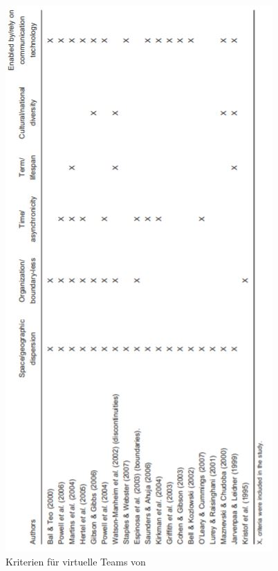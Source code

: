 \documentclass[a4paper,11pt]{article}%
\renewcommand{\\}{\vspace*{0.5\baselineskip} \newline}
\begin{document}
\begin{figure}[H]
		\begin{footnotesize}
			\includegraphics[scale=1]{Abbildungen/criteriaForVirtualTeams.JPG}
			\caption[Abbildung 1]{Kriterien für virtuelle Teams von \citep[p. 27]{schweitzer2010conceptualizing}}
			\label{criteriaForVirtualTeams}
		\end{footnotesize}
	\end{figure}	
	
\end{document}
